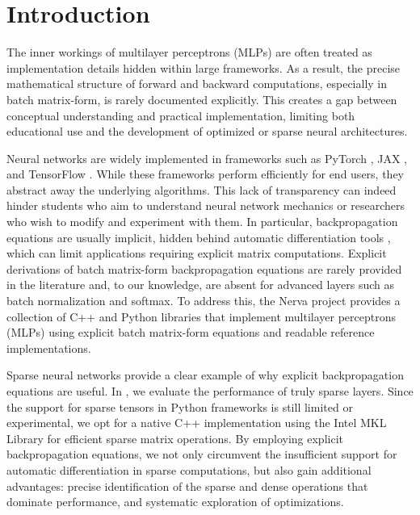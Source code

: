 \documentclass[twoside,11pt]{article}
\begin{document}
\section{Introduction}
The inner workings of multilayer perceptrons (MLPs) are often treated as implementation details hidden within large frameworks. As a result, the precise mathematical structure of forward and backward computations, especially in batch matrix-form, is rarely documented explicitly. This creates a gap between conceptual understanding and practical implementation, limiting both educational use and the development of optimized or sparse neural architectures.

Neural networks are widely implemented in frameworks such as PyTorch \citep{DBLP:conf/nips/PaszkeGMLBCKLGA19}, JAX \citep{jax2018github}, and TensorFlow \citep{DBLP:conf/osdi/AbadiBCCDDDGIIK16}. While these frameworks perform efficiently for end users, they abstract away the underlying algorithms. This lack of transparency can indeed hinder students who aim to understand neural network mechanics or researchers who wish to modify and experiment with them. In particular, backpropagation equations are usually implicit, hidden behind automatic differentiation tools \citep{DBLP:journals/jmlr/BaydinPRS17}, which can limit applications requiring explicit matrix computations. Explicit derivations of batch matrix-form backpropagation equations are rarely provided in the literature and, to our knowledge, are absent for advanced layers such as batch normalization and softmax.
To address this, the Nerva project \citep{Wesselink_Nerva_library} provides a collection of C++ and Python libraries that implement multilayer perceptrons (MLPs) using explicit batch matrix-form equations and readable reference implementations.

Sparse neural networks provide a clear example of why explicit backpropagation equations are useful. In \citet{wesselink2024nervatrulysparseimplementation}, we evaluate the performance of truly sparse layers. Since the support for sparse tensors in Python frameworks is still limited or experimental, we opt for a native C++ implementation using the Intel MKL Library for efficient sparse matrix operations. By employing explicit backpropagation equations, we not only circumvent the insufficient support for automatic differentiation in sparse computations, but also gain additional advantages: precise identification of the sparse and dense operations that dominate performance, and systematic exploration of optimizations.
\end{document}
